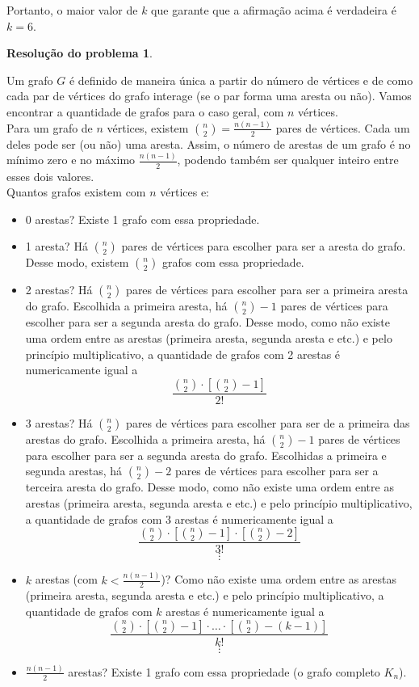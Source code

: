 \documentclass[12pt, a4paper]{article}
\theoremstyle{definition} \newtheorem{prob}{Problema}
\newtheorem{res}{Resolução do problema}
\theoremstyle{plain} \newtheorem*{teo}{Teorema}
\begin{document}
Portanto, o maior valor de \(k\) que garante que a afirmação acima é verdadeira é \(k = 6\).

\begin{res} %
\end{res}
Um grafo \(G\) é definido de maneira única a partir do número de vértices e de como cada par de vértices do grafo interage (se o par forma uma aresta ou não). Vamos encontrar a quantidade de grafos para o caso geral, com \(n\) vértices. \\

Para um grafo de \(n\) vértices, existem \(\binom{n}{2}= \frac{n(n-1)}{2}\) pares de vértices. Cada um deles pode ser (ou não) uma aresta. Assim, o número de arestas de um grafo é no mínimo zero e no máximo \(\frac{n(n-1)}{2}\), podendo também ser qualquer inteiro entre esses dois valores. \\

Quantos grafos existem com \(n\) vértices e: 
\begin{itemize}
\item 0 arestas? Existe 1 grafo com essa propriedade.

\item 1 aresta? Há \(\binom{n}{2}\) pares de vértices para escolher para ser a aresta do grafo. Desse modo, existem \(\binom{n}{2}\) grafos com essa propriedade. 

\item 2 arestas? Há \(\binom{n}{2}\) pares de vértices para escolher para ser a primeira aresta do grafo. Escolhida a primeira aresta, há \(\binom{n}{2}-1\) pares de vértices para escolher para ser a segunda aresta do grafo. Desse modo, como não existe uma ordem entre as arestas (primeira aresta, segunda aresta e etc.) e pelo princípio multiplicativo, a quantidade de grafos com 2 arestas é numericamente igual a \[\dfrac{\binom{n}{2}\cdot{\left[\binom{n}{2}-1\right]}}{2!}\]

\item 3 arestas? Há \(\binom{n}{2}\) pares de vértices para escolher para ser de a primeira das arestas do grafo. Escolhida a primeira aresta, há \(\binom{n}{2}-1\) pares de vértices para escolher para ser a segunda aresta do grafo. Escolhidas a primeira e segunda arestas, há \(\binom{n}{2}-2\) pares de vértices para escolher para ser a terceira aresta do grafo. Desse modo, como não existe uma ordem entre as arestas (primeira aresta, segunda aresta e etc.) e pelo princípio multiplicativo, a quantidade de grafos com 3 arestas é numericamente igual a \[\dfrac{\binom{n}{2}\cdot{\left[\binom{n}{2}-1\right]}\cdot{\left[\binom{n}{2}-2\right]}}{3!}\] 
\[\vdots\]
\item \(k\) arestas (com \(k < \frac{n(n-1)}{2}\))? Como não existe uma ordem entre as arestas (primeira aresta, segunda aresta e etc.) e pelo princípio multiplicativo, a quantidade de grafos com \(k\) arestas é numericamente igual a \[\dfrac{\binom{n}{2}\cdot{\left[\binom{n}{2}-1\right]}\cdot{\hdots}\cdot{\left[\binom{n}{2}-(k-1)\right]}}{k!}\] 
\[\vdots\]
\item \(\frac{n(n-1)}{2}\) arestas? Existe 1 grafo com essa propriedade (o grafo completo \(K_n\)).
\end{itemize}
\end{document}

